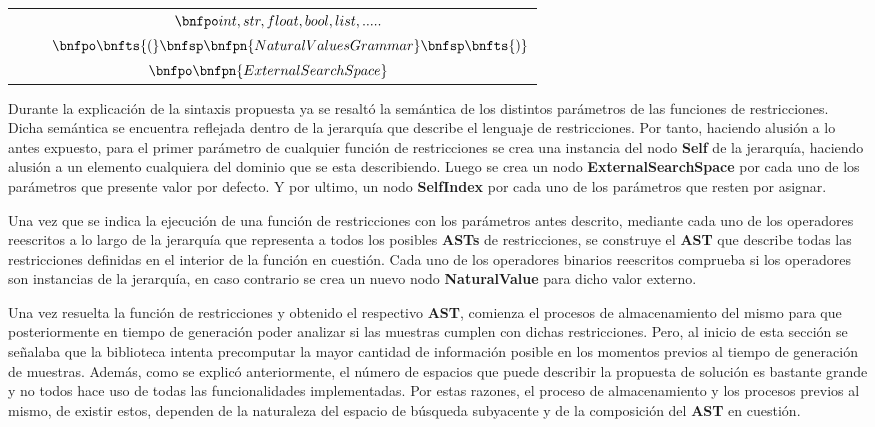 \begin{longtable}{  c  }
    $\hspace{0.3cm}\bnfpo int, str, float, bool, list, .....$                                                                    \\
    $\hspace{0.9cm}\bnfpo \bnfts{(} \bnfsp \bnfpn{NaturalValuesGrammar}\bnfsp \bnfts{)}$                                         \\
    $\hspace{-0.2cm}\bnfpo \bnfpn{ExternalSearchSpace}$
    \\
\end{longtable}

Durante la explicación de la sintaxis propuesta ya se resaltó la semántica de los distintos parámetros de las
funciones de restricciones. Dicha semántica se encuentra reflejada dentro de la jerarquía que describe el
lenguaje de restricciones. Por tanto, haciendo alusión a lo antes expuesto, para el primer parámetro de cualquier
función de restricciones se crea una instancia del nodo {\bf Self} de la jerarquía, haciendo alusión a un elemento
cualquiera del dominio que se esta describiendo. Luego se crea un nodo {\bf ExternalSearchSpace} por cada uno de los
parámetros que presente valor por defecto. Y por ultimo, un nodo {\bf SelfIndex} por cada uno de los parámetros que
resten por asignar.

Una vez que se indica la ejecución de una función de restricciones con los parámetros antes descrito, mediante
cada uno de los operadores reescritos a lo largo de la jerarquía que representa a todos los posibles {\bf ASTs} de
restricciones, se construye el {\bf AST} que describe todas las restricciones definidas en el interior de la función
en cuestión. Cada uno de los operadores binarios reescritos comprueba si los operadores son instancias de la
jerarquía, en caso contrario se crea un nuevo nodo {\bf NaturalValue} para dicho valor externo.

Una vez resuelta la función de restricciones y obtenido el respectivo {\bf AST}, comienza el procesos de almacenamiento
del mismo para que posteriormente en tiempo de generación poder analizar si las muestras cumplen con dichas
restricciones. Pero, al inicio de esta sección se señalaba que la biblioteca intenta precomputar la mayor
cantidad de información posible en los momentos previos al tiempo de generación de muestras. Además, como
se explicó anteriormente, el número de espacios que puede describir la propuesta de solución es bastante
grande y no todos hace uso de todas las funcionalidades implementadas. Por estas razones, el proceso de
almacenamiento y los procesos previos al mismo, de existir estos, dependen de la naturaleza del espacio de búsqueda
subyacente y de la composición del {\bf AST} en cuestión.

